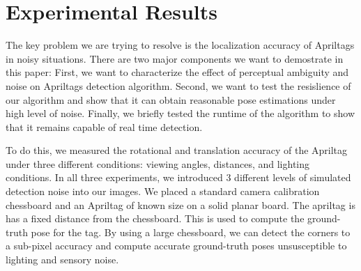 \section{Experimental Results}
\label{sec:res}
The key problem we are trying to resolve is the localization accuracy of Apriltags in noisy situations. There are two major components we want to demostrate in this paper: First, we want to characterize the effect of perceptual ambiguity and noise on Apriltags detection algorithm. Second, we want to test the resislience of our algorithm and show that it can obtain reasonable pose estimations under high level of noise. Finally, we briefly tested the runtime of the algorithm to show that it remains capable of real time detection. 

To do this, we measured the rotational and translation accuracy of the Apriltag under three different conditions: viewing angles, distances, and lighting conditions. In all three experiments, we introduced 3 different levels of simulated detection noise into our images. We placed a standard camera calibration chessboard and an Apriltag of known size on a solid planar board. The apriltag is has a fixed distance from the chessboard. This is used to compute the ground-truth pose for the tag. By using a large chessboard, we can detect the corners to a sub-pixel accuracy and compute accurate ground-truth poses unsusceptible to lighting and sensory noise.

